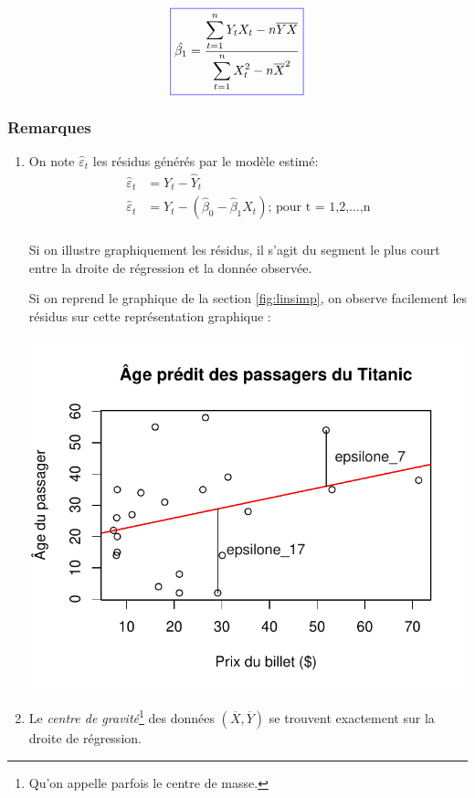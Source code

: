 \documentclass[11pt,french]{report}
\begin{document}
\begin{equation}
\label{eq:beta1}
\color{blue}
\boxed{\color{black}
\hat{\beta_1} = \frac{\displaystyle\sum_{t=1}^n Y_t X_t - n\overline{Y}\overline{X}}{\displaystyle\sum_{t=1}^n X_t^2 - n\overline{X}^2}
}
\end{equation}

\subsubsection{Remarques}

\begin{enumerate}
\item On note $\hat{\varepsilon}_t$ les résidus générés par le modèle estimé:
\begin{align*}
\hat{\varepsilon}_t &= Y_t - \hat{Y}_t \\
\hat{\varepsilon}_t &= Y_t - (\hat{\beta}_0 - \hat{\beta}_1 X_t) \text{; pour t = 1,2,...,n} \\
\end{align*}

Si on illustre graphiquement les résidus, il s'agit du segment le plus court entre la droite de régression et la donnée observée. 

\bigskip
Si on reprend le graphique de la section \ref{fig:linsimp}, on observe facilement les résidus sur cette représentation graphique :

\includegraphics{notes_de_cours-006}

\item Le \emph{centre de gravité}\footnote{Qu'on appelle parfois le centre de masse.} des données $(\overline{X}, \overline{Y})$ se trouvent exactement sur la droite de régression.
\bigskip


\end{enumerate}
\end{document}
